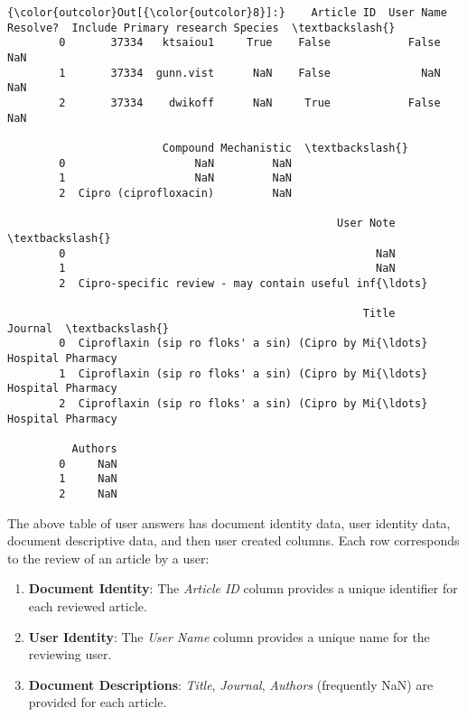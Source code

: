 \documentclass[11pt]{article}
\providecommand{\tightlist}{%
      \setlength{\itemsep}{0pt}\setlength{\parskip}{0pt}}
\begin{document}
\begin{Verbatim}[commandchars=\\\{\}]
{\color{outcolor}Out[{\color{outcolor}8}]:}    Article ID  User Name Resolve?  Include Primary research Species  \textbackslash{}
        0       37334   ktsaiou1     True    False            False     NaN   
        1       37334  gunn.vist      NaN    False              NaN     NaN   
        2       37334    dwikoff      NaN     True            False     NaN   
        
                        Compound Mechanistic  \textbackslash{}
        0                    NaN         NaN   
        1                    NaN         NaN   
        2  Cipro (ciprofloxacin)         NaN   
        
                                                   User Note  \textbackslash{}
        0                                                NaN   
        1                                                NaN   
        2  Cipro-specific review - may contain useful inf{\ldots}   
        
                                                       Title            Journal  \textbackslash{}
        0  Ciproflaxin (sip ro floks' a sin) (Cipro by Mi{\ldots}  Hospital Pharmacy   
        1  Ciproflaxin (sip ro floks' a sin) (Cipro by Mi{\ldots}  Hospital Pharmacy   
        2  Ciproflaxin (sip ro floks' a sin) (Cipro by Mi{\ldots}  Hospital Pharmacy   
        
          Authors  
        0     NaN  
        1     NaN  
        2     NaN  
\end{Verbatim}
            
    The above table of user answers has document identity data, user
identity data, document descriptive data, and then user created columns.
Each row corresponds to the review of an article by a user:

\begin{enumerate}
\def\labelenumi{\arabic{enumi}.}
\tightlist
\item
  \textbf{Document Identity}: The \emph{Article ID} column provides a
  unique identifier for each reviewed article.\\
\item
  \textbf{User Identity}: The \emph{User Name} column provides a unique
  name for the reviewing user.
\item
  \textbf{Document Descriptions}: \emph{Title}, \emph{Journal},
  \emph{Authors} (frequently NaN) are provided for each article.
\end{enumerate}
\end{document}

